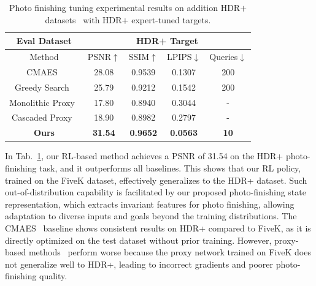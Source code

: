 \documentclass{article}
\begin{document}
\begin{table}[t]
\caption{Photo finishing tuning experimental results on addition HDR$+$ datasets~\cite{hdrplus} with HDR$+$ expert-tuned targets.}
\label{exp:hdrplus}

\centering
\setlength\tabcolsep{3pt}%
\renewcommand\arraystretch{1}%
\begin{adjustbox}{width=0.55\linewidth,center=\linewidth}
\begin{tabular}{c|cccc}
\toprule

\multicolumn{1}{c|}{Eval Dataset}      & \multicolumn{4}{c}{HDR+ Target}     \\ \midrule%

Method &  PSNR$\uparrow$ & SSIM$\uparrow$ & LPIPS$\downarrow$ & Queries$\downarrow$ \\ \midrule

CMAES~\cite{hansen2006cma, mosleh2020hardware}  & 28.08   &0.9539  & 0.1307 & 200 \\
Greedy Search~\cite{Kim2023LearningCI}  &  25.79  &0.9212  & 0.1542 & 200 \\
Monolithic Proxy~\cite{tseng2019hyperparameter}      &17.80 & 0.8940 & 0.3044 & - \\
Cascaded Proxy~\cite{tseng2022neural}  &18.90 &0.8982 & 0.2797 & - \\
\textbf{Ours}   & \textbf{31.54} & \textbf{0.9652} & \textbf{0.0563} & \textbf{10} \\    %
\bottomrule
\end{tabular}
\end{adjustbox}
\vspace{-10pt}
\label{tab:hdrplus}
\end{table}


 

In Tab.~\ref{tab:hdrplus}, our RL-based method achieves a PSNR of 31.54 on the HDR+ photo-finishing task, and it outperforms all baselines. This shows that our RL policy, trained on the FiveK dataset, effectively generalizes to the HDR+ dataset. Such out-of-distribution capability is facilitated by our proposed photo-finishing state representation, which extracts invariant features for photo finishing, allowing adaptation to diverse inputs and goals beyond the training distributions.
The CMAES~\cite{hansen2006cma, mosleh2020hardware} baseline shows consistent results on HDR+ compared to FiveK, as it is directly optimized on the test dataset without prior training. However, proxy-based methods~\cite{tseng2019hyperparameter, tseng2022neural} perform worse because the proxy network trained on FiveK does not generalize well to HDR+, leading to incorrect gradients and poorer photo-finishing quality.
\end{document}
